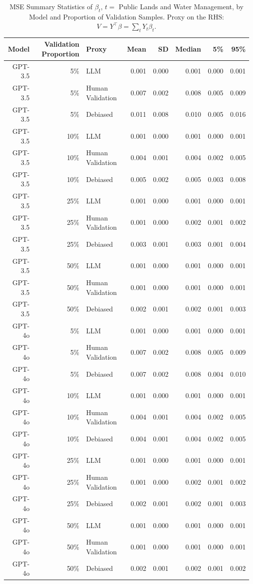 \begin{table}

\caption{\label{tab:unnamed-chunk-1}MSE Summary Statistics of $\beta_{t}$, $t=$ Public Lands and Water Management, by Model and Proportion of Validation Samples.
      Proxy on the RHS: $V = Y^\top \beta = \sum_{t} Y_t \beta_t$.}
\centering
\begin{tabular}[t]{rrlrrrrr}
\toprule
Model & Validation Proportion & Proxy & Mean & SD & Median & 5\% & 95\%\\
\midrule
GPT-3.5 & 5\% & LLM & 0.001 & 0.000 & 0.001 & 0.000 & 0.001\\
GPT-3.5 & 5\% & Human Validation & 0.007 & 0.002 & 0.008 & 0.005 & 0.009\\
GPT-3.5 & 5\% & Debiased & 0.011 & 0.008 & 0.010 & 0.005 & 0.016\\
GPT-3.5 & 10\% & LLM & 0.001 & 0.000 & 0.001 & 0.000 & 0.001\\
GPT-3.5 & 10\% & Human Validation & 0.004 & 0.001 & 0.004 & 0.002 & 0.005\\
GPT-3.5 & 10\% & Debiased & 0.005 & 0.002 & 0.005 & 0.003 & 0.008\\
GPT-3.5 & 25\% & LLM & 0.001 & 0.000 & 0.001 & 0.000 & 0.001\\
GPT-3.5 & 25\% & Human Validation & 0.001 & 0.000 & 0.002 & 0.001 & 0.002\\
GPT-3.5 & 25\% & Debiased & 0.003 & 0.001 & 0.003 & 0.001 & 0.004\\
GPT-3.5 & 50\% & LLM & 0.001 & 0.000 & 0.001 & 0.000 & 0.001\\
GPT-3.5 & 50\% & Human Validation & 0.001 & 0.000 & 0.001 & 0.000 & 0.001\\
GPT-3.5 & 50\% & Debiased & 0.002 & 0.001 & 0.002 & 0.001 & 0.003\\
GPT-4o & 5\% & LLM & 0.001 & 0.000 & 0.001 & 0.000 & 0.001\\
GPT-4o & 5\% & Human Validation & 0.007 & 0.002 & 0.008 & 0.005 & 0.009\\
GPT-4o & 5\% & Debiased & 0.007 & 0.002 & 0.008 & 0.004 & 0.010\\
GPT-4o & 10\% & LLM & 0.001 & 0.000 & 0.001 & 0.000 & 0.001\\
GPT-4o & 10\% & Human Validation & 0.004 & 0.001 & 0.004 & 0.002 & 0.005\\
GPT-4o & 10\% & Debiased & 0.004 & 0.001 & 0.004 & 0.002 & 0.005\\
GPT-4o & 25\% & LLM & 0.001 & 0.000 & 0.001 & 0.000 & 0.001\\
GPT-4o & 25\% & Human Validation & 0.001 & 0.000 & 0.002 & 0.001 & 0.002\\
GPT-4o & 25\% & Debiased & 0.002 & 0.001 & 0.002 & 0.001 & 0.003\\
GPT-4o & 50\% & LLM & 0.001 & 0.000 & 0.001 & 0.000 & 0.001\\
GPT-4o & 50\% & Human Validation & 0.001 & 0.000 & 0.001 & 0.000 & 0.001\\
GPT-4o & 50\% & Debiased & 0.002 & 0.001 & 0.002 & 0.001 & 0.002\\
\bottomrule
\end{tabular}
\end{table}
